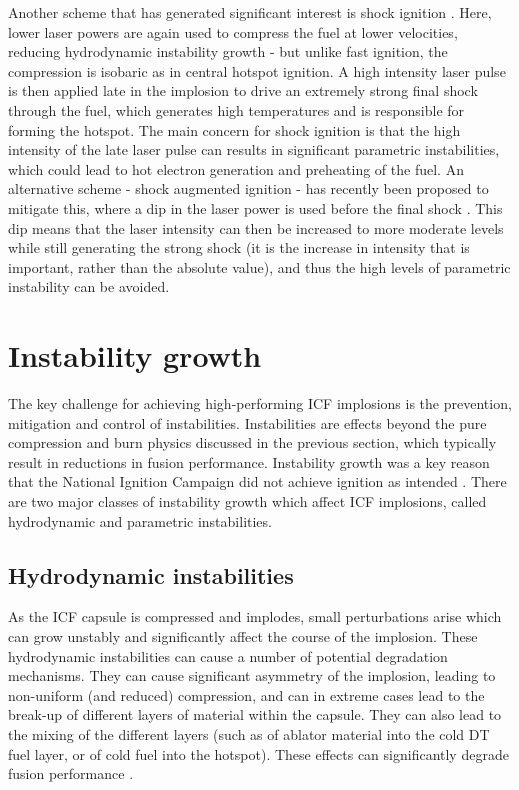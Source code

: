 Another scheme that has generated significant interest is shock ignition \cite{Betti2007}. Here, lower laser powers are again used to compress the fuel at lower velocities, reducing hydrodynamic instability growth - but unlike fast ignition, the compression is isobaric  as in central hotspot ignition. A high intensity laser pulse is then applied late in the implosion to drive an extremely strong final shock through the fuel, which generates high temperatures and is responsible for forming the hotspot. The main concern for shock ignition is that the high intensity of the late laser pulse can results in significant parametric instabilities, which could lead to hot electron generation and preheating of the fuel. An alternative scheme - shock augmented ignition - has recently been proposed to mitigate this, where a dip in the laser power is used before the final shock \cite{Scott2022}. This dip means that the laser intensity can then be increased to more moderate levels while still generating the strong shock (it is the increase in intensity that is important, rather than the absolute value), and thus the high levels of parametric instability can be avoided.


\section{Instability growth}
The key challenge for achieving high-performing ICF implosions is the prevention, mitigation and control of instabilities. Instabilities are effects beyond the pure compression and burn physics discussed in the previous section, which typically result in reductions in fusion performance. Instability growth was a key reason that the National Ignition Campaign did not achieve ignition as intended \cite{Lindl2014, Hurricane2014}. There are two major classes of instability growth which affect ICF implosions, called hydrodynamic and parametric instabilities.

\subsection{Hydrodynamic instabilities} \label{Hydro instabilities}
As the ICF capsule is compressed and implodes, small perturbations arise which can grow unstably and significantly affect the course of the implosion. These hydrodynamic instabilities can cause a number of potential degradation mechanisms. They can cause significant asymmetry of the implosion, leading to non-uniform (and reduced) compression, and can in extreme cases lead to the break-up of different layers of material within the capsule. They can also lead to the mixing of the different layers (such as of ablator material into the cold DT fuel layer, or of cold fuel into the hotspot). These effects can significantly degrade fusion performance \cite{Ma2013}.

